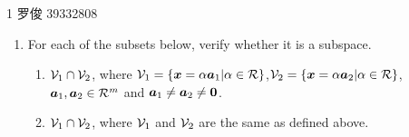 \documentclass[11pt,UTF8]{ctexart}
\begin{document}
 
	\courseInfo
		{1} %
	\studentInfo
		{罗俊} %
		{39332808} %
	\begin{enumerate}
		\item For each of the subsets below, verify whether it is a subspace.
		\begin{enumerate}
			\item $\mathcal{V}_1\cap\mathcal{V}_2$, where $\mathcal{V}_1=\left\{\bm{x}=\alpha\bm{a}_1|\alpha\in\mathcal{R}\right\}$,$\mathcal{V}_2=\left\{\bm{x}=\alpha\bm{a}_2|\alpha\in\mathcal{R}\right\}$, $\bm{a}_1,\bm{a}_2\in\mathcal{R}^m$ and $\bm{a}_1\ne\bm{a}_2\ne{\bm 0}$.
			\item $\mathcal{V}_1\cap\mathcal{V}_2$, where $\mathcal{V}_1$ and $\mathcal{V}_2$ are the same as defined above.
		\end{enumerate}
	\end{enumerate}
\end{document}
